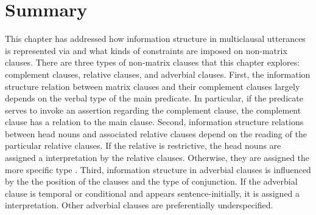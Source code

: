 \section{Summary}
\label{10-2:ssec:Summary}


This chapter has addressed how information structure in multiclausal
utterances is represented via  and what kinds of
constraints are imposed on non-matrix clauses.
There are three types of non-matrix clauses that this chapter
explores: complement clauses, relative clauses, and adverbial
clauses. First, the information structure relation between matrix
clauses and their complement clauses largely depends on the verbal
type of the main predicate. In particular, if the predicate serves to
invoke an assertion regarding the complement clause, the complement
clause has a  relation to the main clause. Second, information structure relations between head nouns
and associated relative clauses depend on the reading of the
particular relative clauses. If the relative is restrictive, the head
nouns are assigned a  interpretation by the
relative clauses. Otherwise, they are assigned the more specific type
. Third, information structure in adverbial
clauses is influenced by the the position of the clauses and the type
of conjunction. If the adverbial clause is temporal or conditional and
appears sentence-initially, it is assigned a 
interpretation. Other adverbial clauses are preferentially
underspecified.



